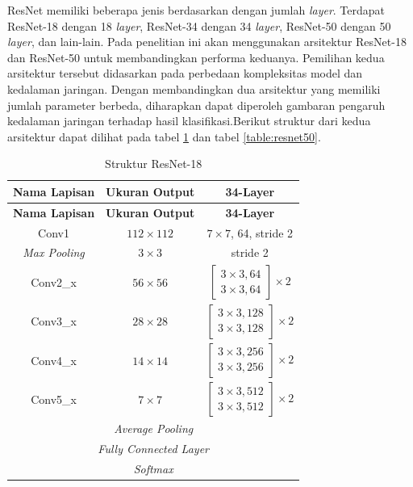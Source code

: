 ResNet memiliki beberapa jenis berdasarkan dengan jumlah \textit{layer}. 
Terdapat ResNet-18 dengan 18 \textit{layer}, ResNet-34 dengan 34 
\textit{layer}, ResNet-50 dengan 50 \textit{layer}, dan lain-lain. Pada 
penelitian ini akan menggunakan arsitektur ResNet-18 dan ResNet-50 untuk 
membandingkan performa keduanya. Pemilihan kedua arsitektur tersebut 
didasarkan pada perbedaan kompleksitas model dan kedalaman jaringan. 
Dengan membandingkan dua arsitektur yang memiliki jumlah parameter 
berbeda, diharapkan dapat diperoleh gambaran pengaruh kedalaman jaringan 
terhadap hasil klasifikasi.Berikut struktur dari kedua arsitektur dapat 
dilihat pada tabel \ref{table:resnet18} dan tabel \ref{table:resnet50}. \par

\begingroup
\renewcommand{\arraystretch}{1.4} %
\setlength{\tabcolsep}{12pt} %
\begin{longtable}{|c|c|c|} %
	\caption{Struktur ResNet-18 \cite{he2015deepresiduallearningimage}}
	\label{table:resnet18}\\
	\hline
	\textbf{Nama Lapisan} & \textbf{Ukuran Output} & \textbf{34-Layer} \\
	\hline
	\endfirsthead %
	\hline
	\textbf{Nama Lapisan} & \textbf{Ukuran Output} & \textbf{34-Layer} \\
	\hline
	\endhead %
	Conv1 & $112 \times 112$ & $7 \times 7$, 64, stride 2\\ 
	\hline
	\textit{Max Pooling} & $3 \times 3$ & stride 2\\ 
	\hline
	Conv2\_x & $56 \times 56$ & $\left[\begin{array}{c} 3 \times 3, 64 \\ 3 \times 3, 64 \end{array}\right] \times 2$\\ 
	\hline
	Conv3\_x & $28 \times 28$ & $\left[\begin{array}{c} 3 \times 3, 128 \\ 3 \times 3, 128 \end{array}\right] \times 2$\\ 
	\hline
	Conv4\_x & $14 \times 14$ & $\left[\begin{array}{c} 3 \times 3, 256 \\ 3 \times 3, 256 \end{array}\right] \times 2$\\ 
	\hline
	Conv5\_x & $7 \times 7$ & $\left[\begin{array}{c} 3 \times 3, 512 \\ 3 \times 3, 512 \end{array}\right] \times 2$\\ 
	\hline
	\multicolumn{3}{|c|}{\textit{Average Pooling}}\\ 
	\hline
	\multicolumn{3}{|c|}{\textit{Fully Connected Layer}}\\ 
	\hline
	\multicolumn{3}{|c|}{\textit{Softmax}}\\ 
	\hline
\end{longtable}
\endgroup

